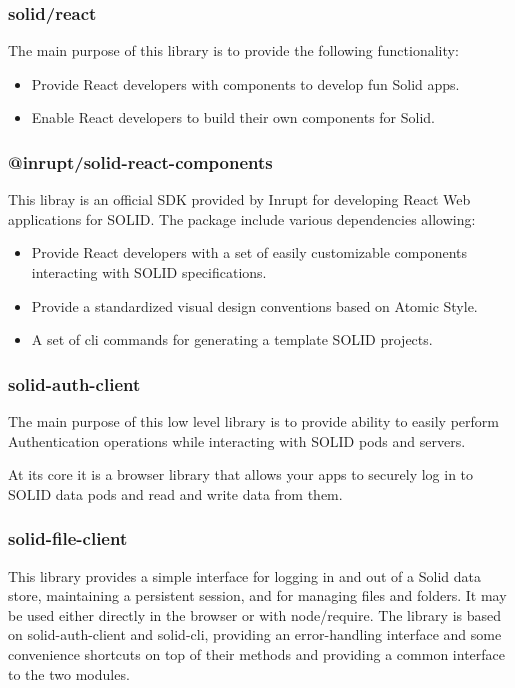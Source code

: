 \subsubsection{solid/react}

The main purpose of this library is to provide the following functionality:

\begin{itemize}
	\item Provide React developers with components to develop fun Solid apps.
    \item Enable React developers to build their own components for Solid.
\end{itemize}

\subsubsection{@inrupt/solid-react-components}

This libray is an official SDK provided by Inrupt for developing React Web applications for SOLID. The package include various dependencies allowing:

\begin{itemize}
	\item Provide React developers with a set of easily customizable components interacting with SOLID specifications.
    \item Provide a standardized visual design conventions based on Atomic Style.
    \item A set of cli commands for generating a template SOLID projects.
\end{itemize}

\subsubsection{solid-auth-client}

The main purpose of this low level library is to provide ability to easily perform Authentication operations while interacting with SOLID pods and servers.

At its core it is a browser library that allows your apps to securely log in to SOLID data pods and read and write data from them.

\subsubsection{solid-file-client}

This library provides a simple interface for logging in and out of a Solid data store, maintaining a persistent session, and for managing files and folders. It may be used either directly in the browser or with node/require. The library is based on solid-auth-client and solid-cli, providing an error-handling interface and some convenience shortcuts on top of their methods and providing a common interface to the two modules.

